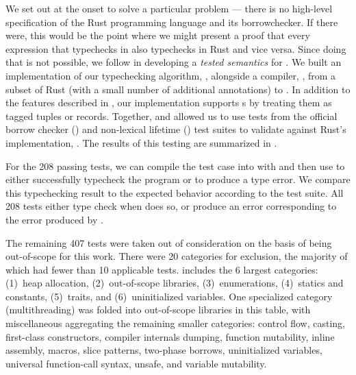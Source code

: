 We set out at the onset to solve a particular problem --- there is no high-level
specification of the Rust programming language and its borrowchecker. If there
were, this would be the point where we might present a proof that every
expression that typechecks in \lang also typechecks in Rust and vice versa.
Since doing that is not possible, we follow \citet{guha10:essence-js} in
developing a \emph{tested semantics} for \lang. We built an implementation of
our \lang typechecking algorithm, \typechecker, alongside a compiler, \compiler,
from a subset of Rust (with a small number of additional annotations) to \lang.
In addition to the features described in , our
implementation supports s by treating them as tagged tuples or
records. Together, \compiler and \typechecker allowed us to use tests from the
official borrow checker () and non-lexical lifetime
() test suites to validate \lang against Rust's implementation,
\rustc. The results of this testing are summarized in .

For the 208 passing tests, we can compile the test case into \lang with
\compiler and then use \typechecker to either successfully typecheck the
program or to produce a type error. We compare this typechecking result to the
expected behavior according to the \rustc test suite. All 208 tests either type
check when \rustc does so, or produce an error corresponding to the error
produced by \rustc.

The remaining 407 tests were taken out of consideration on the basis of being
out-of-scope for this work. There were 20 categories for exclusion, the majority
of which had fewer than 10 applicable tests.  includes the
6 largest categories: (1)~heap allocation, (2)~out-of-scope libraries,
(3)~enumerations, (4)~statics and constants, (5)~traits, and (6)~uninitialized
variables. One specialized category (multithreading) was folded into
out-of-scope libraries in this table, with miscellaneous aggregating the
remaining smaller categories: control flow, casting, first-class constructors,
compiler internals dumping, function mutability, inline assembly, macros, slice
patterns, two-phase borrows, uninitialized variables, universal function-call
syntax, unsafe, and variable mutability.


